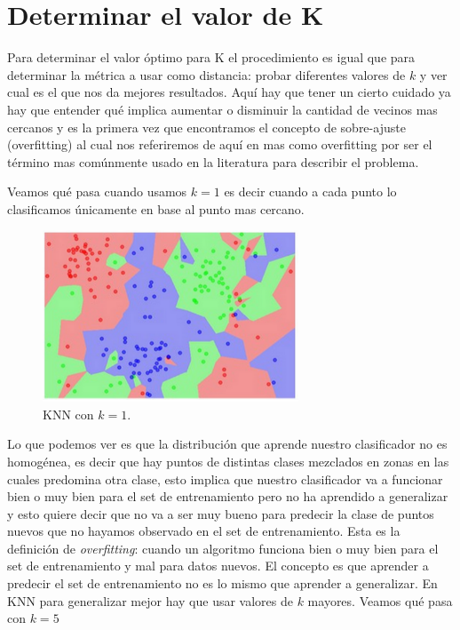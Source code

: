 \section{Determinar el valor de K}

Para determinar el valor óptimo para K el procedimiento es igual que para determinar la métrica a usar como distancia: probar diferentes valores de $k$ y ver cual es el que nos da mejores resultados. Aquí hay que tener un cierto cuidado ya hay que entender qué implica aumentar o disminuir la cantidad de vecinos mas cercanos y es la primera vez que encontramos el concepto de sobre-ajuste (overfitting) al cual nos referiremos de aquí en mas como overfitting por ser el término mas comúnmente usado en la literatura para describir el problema.

Veamos qué pasa cuando usamos $k=1$ es decir cuando a cada punto lo clasificamos únicamente en base al punto mas cercano.

\begin{figure}[!htb]
\centering
\includegraphics[width=3in]{figures/kn1-fig.png}
\caption{KNN con $k=1$.}
\label{fig14}

\end{figure}

Lo que podemos ver es que la distribución que aprende nuestro clasificador no es homogénea, es decir que hay puntos de distintas clases mezclados en zonas en las cuales predomina otra clase, esto implica que nuestro clasificador va a funcionar bien o muy bien para el set de entrenamiento pero no ha aprendido a generalizar y esto quiere decir que no va a ser muy bueno para predecir la clase de puntos nuevos que no hayamos observado en el set de entrenamiento. Esta es la definición de \textit{overfitting}: cuando un algoritmo funciona bien o muy bien para el set de entrenamiento y mal para datos nuevos. El concepto es que aprender a predecir el set de entrenamiento no es lo mismo que aprender a generalizar. En KNN para generalizar mejor hay que usar valores de $k$ mayores. Veamos qué pasa con $k=5$

